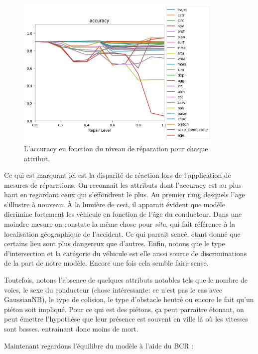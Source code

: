 \documentclass{article}
\begin{document}
    \begin{figure}[h]
        \centering
        \includegraphics[width=10cm]{./img/accuracy.png}
        \caption{L'accuracy en fonction du niveau de réparation pour chaque attribut.}
    \end{figure}

    Ce qui est marquant ici est la disparité de réaction lors de l'application de mesures de réparations. On reconnait les 
    attributs dont l'accuracy est au plus haut en regardant ceux qui s'effondrent le plus. Au premier rang desquels l'age s'illustre
    à nouveau. À la lumière de ceci, il apparait évident que modèle dicrimine fortement les véhicule en fonction de l'âge du 
    conducteur. Dans une moindre mesure on constate la même chose pour \textit{situ}, qui fait référence à la localisation 
    géographique de l'accident. Ce qui parrait sencé, étant donné que certains lieu sont plus dangereux que d'autres. Enfin, 
    notons que le type d'intersection et la catégorie du véhicule est elle aussi source de discriminations de la part de notre 
    modèle. Encore une fois cela semble faire sense.

    Toutefois, notons l'absence de quelques attributs notables tels que le nombre de voies, le sexe du conducteur (chose intéressante:
    ce n'est pas le cas avec GaussianNB),  le type de colision, le type d'obstacle heutré ou encore le fait qu'un piéton soit impliqué.
    Pour ce qui est des piétons, ça peut parraitre étonant, on peut émettre l'hypothèse que leur présence est souvent en ville là où 
    les vitesses sont basses. entrainant donc moins de mort.

    Maintenant regardons l'équilibre du modèle à l'aide du BCR : 
\end{document}

